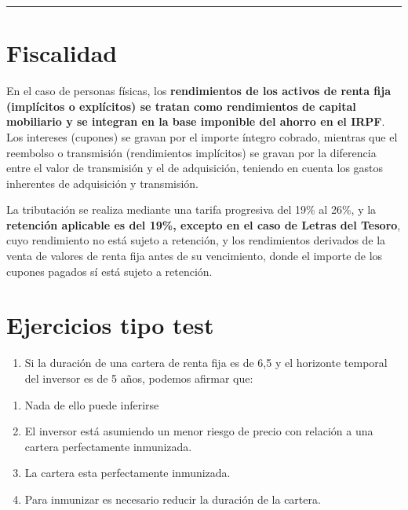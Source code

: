 \documentclass[
  letterpaper,
  DIV=11,
  numbers=noendperiod]{scrartcl}
\providecommand{\tightlist}{%
  \setlength{\itemsep}{0pt}\setlength{\parskip}{0pt}}\usepackage{longtable,booktabs,array}
\begin{document}
\begin{center}\rule{0.5\linewidth}{0.5pt}\end{center}

\hypertarget{fiscalidad}{%
\section{Fiscalidad}\label{fiscalidad}}

En el caso de personas físicas, los \textbf{rendimientos de los activos
de renta fija (implícitos o explícitos) se tratan como rendimientos de
capital mobiliario y se integran en la base imponible del ahorro en el
IRPF}. Los intereses (cupones) se gravan por el importe íntegro cobrado,
mientras que el reembolso o transmisión (rendimientos implícitos) se
gravan por la diferencia entre el valor de transmisión y el de
adquisición, teniendo en cuenta los gastos inherentes de adquisición y
transmisión.

La tributación se realiza mediante una tarifa progresiva del 19\% al
26\%, y la \textbf{retención aplicable es del 19\%, excepto en el caso
de Letras del Tesoro}, cuyo rendimiento no está sujeto a retención, y
los rendimientos derivados de la venta de valores de renta fija antes de
su vencimiento, donde el importe de los cupones pagados sí está sujeto a
retención.

\hypertarget{ejercicios-tipo-test}{%
\section{Ejercicios tipo test}\label{ejercicios-tipo-test}}

\begin{enumerate}
\def\labelenumi{\arabic{enumi}.}
\tightlist
\item
  Si la duración de una cartera de renta fija es de 6,5 y el horizonte
  temporal del inversor es de 5 años, podemos afirmar que:
\end{enumerate}

\begin{enumerate}
\def\labelenumi{\alph{enumi}.}
\item
  Nada de ello puede inferirse
\item
  El inversor está asumiendo un menor riesgo de precio con relación a
  una cartera perfectamente inmunizada.
\item
  La cartera esta perfectamente inmunizada.
\item
  Para inmunizar es necesario reducir la duración de la cartera.
\end{enumerate}
\end{document}
